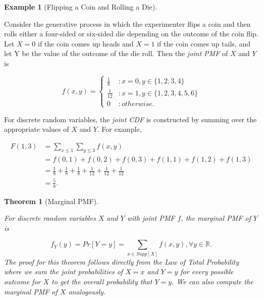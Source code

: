 \documentclass[
]{article}
\newtheorem{theorem}{Theorem}[section]
\theoremstyle{definition}
\theoremstyle{definition}
\newtheorem{example}{Example}[section]
\theoremstyle{definition}
\theoremstyle{remark}
\begin{document}
\begin{example}[Flipping a Coin and Rolling a Die]
\protect\hypertarget{exm:unlabeled-div-42}{}\label{exm:unlabeled-div-42}

Consider the generative process in which the experimenter flips a coin and then rolls either a four-sided or six-sided die depending on the outcome of the coin flip. Let \(X = 0\) if the coin comes up heads and \(X = 1\) if the coin comes up tails, and let Y be the value of the outcome of the die roll. Then the \emph{joint PMF} of \(X\) and \(Y\) is

\[f(x,y) = \begin{cases} \frac{1}{8} &: x = 0, y \in \{1,2,3,4\} \\ \frac{1}{12} &: x = 1, y \in \{1,2,3,4,5,6\} \\ 0 &: otherwise. \end{cases}\]

For discrete random variables, the \emph{joint CDF} is constructed by summing over the appropriate values of \(X\) and \(Y\). For example,

\[\begin{align}F(1,3) &=\sum_{x \leq 1}\sum_{y \leq 3} f(x,y) \\ &= f(0,1) + f(0,2) + f(0,3) + f(1,1) + f(1,2) + f(1,3) \\ &= \frac{1}{8} + \frac{1}{8} + \frac{1}{8} + \frac{1}{12} + \frac{1}{12} + \frac{1}{12} \\ &= \frac{5}{8}. \end{align}\]

\end{example}

\begin{theorem}[Marginal PMF]
\protect\hypertarget{thm:unlabeled-div-43}{}\label{thm:unlabeled-div-43}

For discrete random variables \(X\) and \(Y\) with joint PMF \(f\), the \emph{marginal PMF} of \(Y\) is

\[f_Y(y) = Pr[Y = y] = \sum_{x \in Supp[X]}f(x,y), \forall y \in \mathbb{R}.\]
The proof for this theorem follows directly from the \emph{Law of Total Probability} where we sum the joint probabilities of \(X = x\) and \(Y = y\) for every possible outcome for \(X\) to get the overall probability that \(Y = y\). We can also compute the marginal PMF of \(X\) analogously.

\end{theorem}
\end{document}
